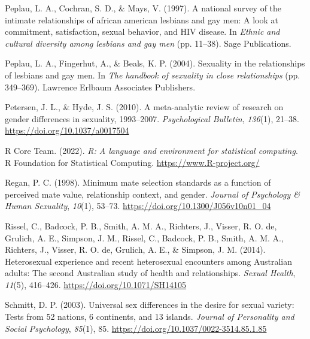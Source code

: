 \documentclass[
  11pt,
]{article}
\newlength{\cslhangindent}
\newlength{\cslentryspacingunit} %
\newenvironment{CSLReferences}[2] %
 {%
  \setlength{\parindent}{0pt}
  \ifodd #1
  \let\oldpar\par
  \def\par{\hangindent=\cslhangindent\oldpar}
  \fi
  \setlength{\parskip}{#2\cslentryspacingunit}
 }%
 {}
\begin{document}
\begin{CSLReferences}{1}{0}
\leavevmode{}%
Peplau, L. A., Cochran, S. D., \& Mays, V. (1997). A national survey of
the intimate relationships of african american lesbians and gay men: A
look at commitment, satisfaction, sexual behavior, and {HIV} disease. In
\emph{Ethnic and cultural diversity among lesbians and gay men} (pp.
11--38). Sage Publications.

\leavevmode{}%
Peplau, L. A., Fingerhut, A., \& Beals, K. P. (2004). Sexuality in the
relationships of lesbians and gay men. In \emph{The handbook of
sexuality in close relationships} (pp. 349--369). Lawrence Erlbaum
Associates Publishers.

\leavevmode{}%
Petersen, J. L., \& Hyde, J. S. (2010). A meta-analytic review of
research on gender differences in sexuality, 1993--2007.
\emph{Psychological Bulletin}, \emph{136}(1), 21--38.
\url{https://doi.org/10.1037/a0017504}

\leavevmode{}%
R Core Team. (2022). \emph{R: A language and environment for statistical
computing}. R Foundation for Statistical Computing.
\url{https://www.R-project.org/}

\leavevmode{}%
Regan, P. C. (1998). Minimum mate selection standards as a function of
perceived mate value, relationship context, and gender. \emph{Journal of
Psychology \& Human Sexuality}, \emph{10}(1), 53--73.
\url{https://doi.org/10.1300/J056v10n01_04}

\leavevmode{}%
Rissel, C., Badcock, P. B., Smith, A. M. A., Richters, J., Visser, R. O.
de, Grulich, A. E., Simpson, J. M., Rissel, C., Badcock, P. B., Smith,
A. M. A., Richters, J., Visser, R. O. de, Grulich, A. E., \& Simpson, J.
M. (2014). Heterosexual experience and recent heterosexual encounters
among {A}ustralian adults: The second {A}ustralian study of health and
relationships. \emph{Sexual Health}, \emph{11}(5), 416--426.
\url{https://doi.org/10.1071/SH14105}

\leavevmode{}%
Schmitt, D. P. (2003). Universal sex differences in the desire for
sexual variety: Tests from 52 nations, 6 continents, and 13 islands.
\emph{Journal of Personality and Social Psychology}, \emph{85}(1), 85.
\url{https://doi.org/10.1037/0022-3514.85.1.85}


\end{CSLReferences}
\end{document}

